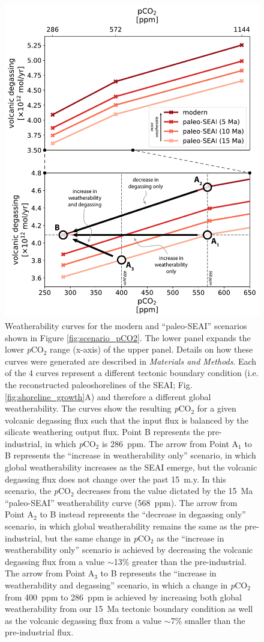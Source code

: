 \documentclass[9pt,twocolumn,twoside,lineno]{pnas-new}
\newcommand{\pCOtwo}{\textit{p}CO$_{2}$\xspace}
\newcommand{\MM}{\textit{Materials and Methods}\xspace}
\begin{document}
\begin{figure}[h!]
    \centering
    \includegraphics[width=1\linewidth]{Manuscript/Figures/weatherability_curves.pdf}
    \caption{Weatherability curves for the modern and ``paleo-SEAI'' scenarios shown in Figure \ref{fig:scenario_pCO2}. The lower panel expands the lower \pCOtwo range (x-axis) of the upper panel. Details on how these curves were generated are described in \MM. Each of the 4 curves represent a different tectonic boundary condition (i.e. the reconstructed paleoshorelines of the SEAI; Fig. \ref{fig:shoreline_growth}A) and therefore a different global weatherability. The curves show the resulting \pCOtwo for a given volcanic degassing flux such that the input flux is balanced by the silicate weathering output flux. Point B represents the pre-industrial, in which \pCOtwo is 286~ppm. The arrow from Point A$_{1}$ to B represents the ``increase in weatherability only'' scenario, in which global weatherability increases as the SEAI emerge, but the volcanic degassing flux does not change over the past 15~m.y. In this scenario, the \pCOtwo decreases from the value dictated by the 15~Ma ``paleo-SEAI'' weatherability curve (568~ppm). The arrow from Point A$_{2}$ to B instead represents the ``decrease in degassing only'' scenario, in which global weatherability remains the same as the pre-industrial, but the same change in \pCOtwo as the ``increase in weatherability only'' scenario is achieved by decreasing the volcanic degassing flux from a value $\sim$13\% greater than the pre-industrial. The arrow from Point A$_{3}$ to B represents the ``increase in weatherability and degassing'' scenario, in which a change in \pCOtwo from 400~ppm to 286~ppm is achieved by increasing both global weatherability from our 15~Ma tectonic boundary condition as well as the volcanic degassing flux from a value $\sim$7\% smaller than the pre-industrial flux.}

\end{figure}
\end{document}
